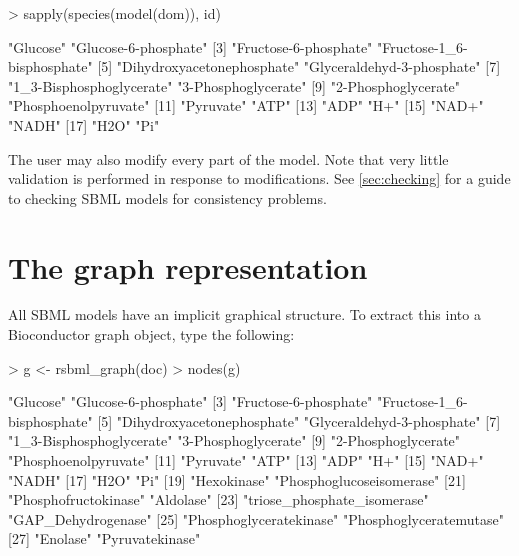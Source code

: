 \documentclass[english]{article}
\begin{document}
\begin{Schunk}
\begin{Sinput}
> sapply(species(model(dom)), id)
\end{Sinput}
\begin{Soutput}
 [1] "Glucose"                   "Glucose-6-phosphate"      
 [3] "Fructose-6-phosphate"      "Fructose-1_6-bisphosphate"
 [5] "Dihydroxyacetonephosphate" "Glyceraldehyd-3-phosphate"
 [7] "1_3-Bisphosphoglycerate"   "3-Phosphoglycerate"       
 [9] "2-Phosphoglycerate"        "Phosphoenolpyruvate"      
[11] "Pyruvate"                  "ATP"                      
[13] "ADP"                       "H+"                       
[15] "NAD+"                      "NADH"                     
[17] "H2O"                       "Pi"                       
\end{Soutput}
\end{Schunk}

The user may also modify every part of the model. Note that very little 
validation is performed in response to modifications. See \ref{sec:checking} for
a guide to checking SBML models for consistency problems.

\section*{The graph representation}
All SBML models have an implicit graphical structure. To extract this into
a Bioconductor graph object, type the following:

\begin{Schunk}
\begin{Sinput}
> g <- rsbml_graph(doc)
> nodes(g)
\end{Sinput}
\begin{Soutput}
 [1] "Glucose"                    "Glucose-6-phosphate"       
 [3] "Fructose-6-phosphate"       "Fructose-1_6-bisphosphate" 
 [5] "Dihydroxyacetonephosphate"  "Glyceraldehyd-3-phosphate" 
 [7] "1_3-Bisphosphoglycerate"    "3-Phosphoglycerate"        
 [9] "2-Phosphoglycerate"         "Phosphoenolpyruvate"       
[11] "Pyruvate"                   "ATP"                       
[13] "ADP"                        "H+"                        
[15] "NAD+"                       "NADH"                      
[17] "H2O"                        "Pi"                        
[19] "Hexokinase"                 "Phosphoglucoseisomerase"   
[21] "Phosphofructokinase"        "Aldolase"                  
[23] "triose_phosphate_isomerase" "GAP_Dehydrogenase"         
[25] "Phosphoglyceratekinase"     "Phosphoglyceratemutase"    
[27] "Enolase"                    "Pyruvatekinase"            
\end{Soutput}
\end{Schunk}
\end{document}

